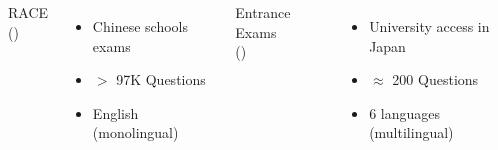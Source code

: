 \mAlertSpace
\mAlertSpace
\begin{columns}[T, onlytextwidth]
  RACE \\(\cite{Lai2017})
  \mAlertSpace
  \hline
  \mAlertSpace
    \begin{itemize}
      \item Chinese schools exams
      \item $>$ 97K Questions
      \item English (monolingual)
    \end{itemize}
  Entrance Exams \\(\cite{rodrigo_systems_2018})
  \mAlertSpace
  \hline
  \mAlertSpace
    \begin{itemize}
      \item University access in Japan
      \item $\approx$ 200 Questions
      \item 6 languages (multilingual)
    \end{itemize}
\end{columns}
